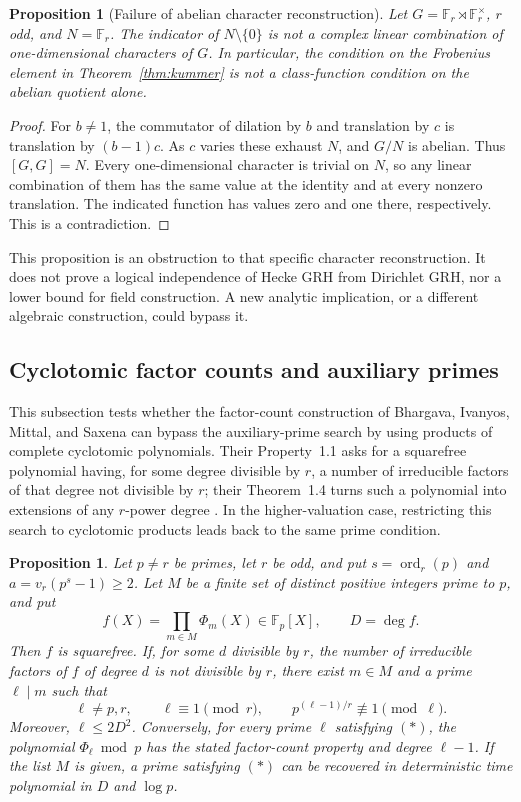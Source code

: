 \documentclass[11pt]{article}
\newcommand{\F}{\mathbb F}
\newtheorem{proposition}[theorem]{Proposition}
\theoremstyle{definition}
\theoremstyle{remark}
\begin{document}
\begin{proposition}[Failure of abelian character reconstruction]
\label{prop:abelianobstruction}
Let $G=\F_r\rtimes\F_r^\times$, $r$ odd, and
$N=\F_r$.  The indicator of $N\setminus\{0\}$ is not
a complex linear combination of one-dimensional characters of $G$.
In particular, the condition on the Frobenius element in
Theorem~\ref{thm:kummer} is not a class-function condition
on the abelian quotient alone.
\end{proposition}
\begin{proof}
For $b\ne1$, the commutator of dilation by $b$ and
translation by $c$ is translation by $(b-1)c$.
As $c$ varies these exhaust $N$, and $G/N$ is abelian.
Thus $[G,G]=N$.  Every one-dimensional character is
trivial on $N$, so any linear combination of them has
the same value at the identity and at every nonzero
translation.  The indicated function has values zero
and one there, respectively.  This is a contradiction.
\end{proof}

This proposition is an obstruction to that specific character
reconstruction.  It does not prove a logical independence of
Hecke GRH from Dirichlet GRH, nor a lower bound for field
construction.  A new analytic implication, or a different
algebraic construction, could bypass it.

\subsection{Cyclotomic factor counts and auxiliary primes}

This subsection tests whether the factor-count construction of
Bhargava, Ivanyos, Mittal, and Saxena can bypass the auxiliary-prime search
by using products of complete cyclotomic polynomials.
Their Property~1.1 asks for a squarefree polynomial having, for some degree
divisible by $r$, a number of irreducible factors of that degree not divisible
by $r$; their Theorem~1.4 turns such a polynomial into extensions of any
$r$-power degree \cite[p.~2]{BhargavaEtAl2017}.
In the higher-valuation case, restricting this search to cyclotomic
products leads back to the same prime condition.

\begin{proposition}\label{prop:cyclotomic-count}
Let $p\ne r$ be primes, let $r$ be odd, and put
$s=\operatorname{ord}_r(p)$ and $a=v_r(p^s-1)\ge2$.
Let $M$ be a finite set of distinct positive integers prime to $p$, and put
\[
 f(X)=\prod_{m\in M}\Phi_m(X)\in\mathbb F_p[X],
 \qquad D=\deg f.
\]
Then $f$ is squarefree.  If, for some $d$ divisible by $r$, the number of
irreducible factors of $f$ of degree $d$ is not divisible by $r$, there
exist $m\in M$ and a prime $\ell\mid m$ such that
\[
 \ell\ne p,r,\qquad \ell\equiv1\pmod r,
 \qquad p^{(\ell-1)/r}\not\equiv1\pmod\ell.
 \tag{\(*\)}
\]
Moreover, $\ell\le2D^2$.
Conversely, for every prime $\ell$ satisfying \textup{\((*)\)}, the
polynomial $\Phi_\ell\bmod p$ has the stated factor-count property and
degree $\ell-1$.
If the list $M$ is given, a prime satisfying \textup{\((*)\)} can be
recovered in deterministic time polynomial in $D$ and $\log p$.
\end{proposition}
\end{document}
